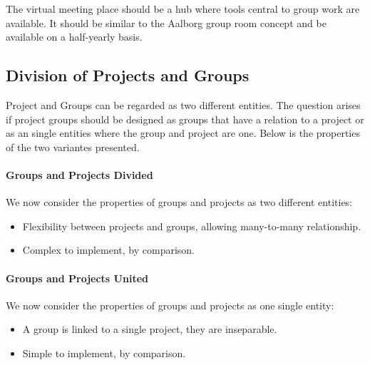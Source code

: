 The virtual meeting place should be a hub where tools central to group work are available.
It should be similar to the Aalborg group room concept and be available on a half-yearly basis.


\subsection{Division of Projects and Groups}
\label{sub:divProjGroup}
Project and Groups can be regarded as two different entities.
The question arises if project groups should be designed as groups that have a relation to a project or as an single entities where the group and project are one.
Below is the properties of the two variantes presented.


\paragraph{Groups and Projects Divided} We now consider the properties of groups and projects as two different entities:
\begin{itemize}
	\item Flexibility between projects and groups, allowing many-to-many relationship.
	\item Complex to implement, by comparison.
\end{itemize}


\paragraph{Groups and Projects United} We now consider the properties of groups and projects as one single entity:
\begin{itemize}
	\item A group is linked to a single project, they are inseparable.
	\item Simple to implement, by comparison.
\end{itemize}

